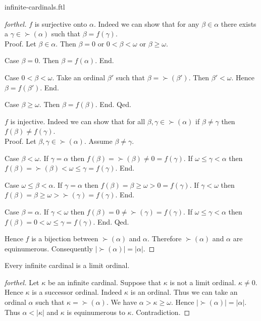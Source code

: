 \documentclass{naproche-library}
\begin{document}
\begin{smodule}{infinite-cardinals.ftl}
\begin{proof}[forthel]
    $f$ is surjective onto $\alpha$.
    Indeed we can show that for any $\beta \in \alpha$ there exists a
    $\gamma \in \succ(\alpha)$ such that $\beta = f(\gamma)$. \\
    Proof.
      Let $\beta \in \alpha$.
      Then $\beta = 0$ or $0 < \beta < \omega$ or $\beta \geq \omega$.

      Case $\beta = 0$.
        Then $\beta = f(\alpha)$.
      End.

      Case $0 < \beta < \omega$.
        Take an ordinal $\beta'$ such that $\beta = \succ(\beta')$.
        Then $\beta' < \omega$.
        Hence $\beta = f(\beta')$.
      End.

      Case $\beta \geq \omega$.
        Then $\beta = f(\beta)$.
      End.
    Qed.

    $f$ is injective.
    Indeed we can show that for all $\beta, \gamma \in \succ(\alpha)$ if
    $\beta \neq \gamma$ then $f(\beta) \neq f(\gamma)$. \\
    Proof.
      Let $\beta, \gamma \in \succ(\alpha)$.
      Assume $\beta \neq \gamma$.

      Case $\beta < \omega$.
        If $\gamma = \alpha$ then
        $f(\beta)
          = \succ(\beta)
          \neq 0
          = f(\gamma)$.
        If $\omega \leq \gamma < \alpha$ then
        $f(\beta)
          = \succ(\beta)
          < \omega
          \leq \gamma
          = f(\gamma)$.
      End.

      Case $\omega \leq \beta < \alpha$.
        If $\gamma = \alpha$ then
        $f(\beta)
          = \beta
          \geq \omega
          > 0
          = f(\gamma)$.
        If $\gamma < \omega$ then
        $f(\beta)
          = \beta
          \geq \omega
          > \succ(\gamma)
          = f(\gamma)$.
      End.

      Case $\beta = \alpha$.
        If $\gamma < \omega$ then
        $f(\beta)
          = 0
          \neq \succ(\gamma)
          = f(\gamma)$.
        If $\omega \leq \gamma < \alpha$ then
        $f(\beta)
          = 0
          < \omega
          \leq \gamma
          = f(\gamma)$.
      End.
    Qed.

    Hence $f$ is a bijection between $\succ(\alpha)$ and $\alpha$.
    Therefore $\succ(\alpha)$ and $\alpha$ are equinumerous.
    Consequently $|\succ(\alpha)| = |\alpha|$.
  \end{proof}

  \begin{proposition}[forthel,id=SET_THEORY_07_8700732632989696]
    Every infinite cardinal is a limit ordinal.
  \end{proposition}
  \begin{proof}[forthel]
    Let $\kappa$ be an infinite cardinal.
    Suppose that $\kappa$ is not a limit ordinal.
    $\kappa \neq 0$.
    Hence $\kappa$ is a successor ordinal.
    Indeed $\kappa$ is an ordinal.
    Thus we can take an ordinal $\alpha$ such that $\kappa = \succ(\alpha)$.
    We have $\alpha > \kappa \geq \omega$.
    Hence $|\succ(\alpha)| = |\alpha|$.
    Thus $\alpha < |\kappa|$ and $\kappa$ is equinumerous to $\kappa$.
    Contradiction.
  \end{proof}
\end{smodule}
\end{document}
